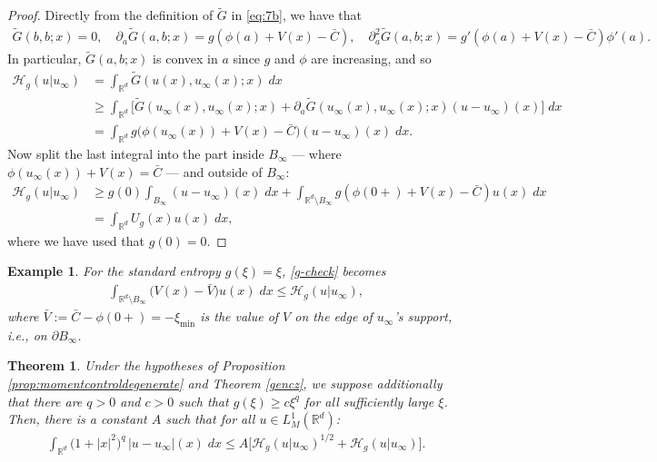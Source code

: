 \documentclass[reqno]{amsart}
\newtheorem{theorem}[lemma]{Theorem}
\newtheorem{example}[lemma]{Example}
\newcommand{\R}{\mathbb{R}}
\newcommand{\Rd}{{\R^d}}
\newcommand{\ximin}{\xi_{\text{min}}}
\newcommand{\uinf}{u_\infty}
\begin{document}
\begin{proof}
    Directly from the definition of $\tilde G$ in \eqref{eq:7b}, we have that
    \begin{align*}
        \tilde G(b,b;x) = 0, \quad
        \partial_a\tilde G(a,b;x) = g(\phi(a)+V(x)-\bar C),\quad
        \partial_a^2\tilde G(a,b;x) = g'(\phi(a)+V(x)-\bar C)\phi'(a).
    \end{align*}
    In particular, $\tilde G(a,b;x)$ is convex in $a$ since $g$ and $\phi$ are increasing, and so
    \begin{align*}
        {\mathcal{H}}_g(u|\uinf)  
        &= \int_{\R^d} \tilde G(u(x),\uinf(x);x)\;dx \\
        &\ge \int_{\R^d} \big[\tilde G(\uinf(x),\uinf(x);x) + \partial_a \tilde G(\uinf(x),\uinf(x);x) (u-\uinf)(x)\big]\;dx \\
        & = \int_{\R^d} g\big(\phi(\uinf(x))+V(x)-\bar C\big) (u-\uinf)(x)\;dx.
    \end{align*}
    Now split the last integral into the part inside $B_\infty$ --- where $\phi(\uinf(x))+V(x)=\bar C$ --- and outside of $B_\infty$:
    \begin{align*}
        {\mathcal{H}}_g(u|\uinf)  
        &\geq g(0) \int_{B_\infty}  (u-\uinf)(x)\;dx +  \int_{\R^d\setminus B_\infty} g(\phi(0+)+V(x)-\bar C) u(x)\;dx \\
        &=  \int_{\R^d} U_g (x) u(x)\;dx,
    \end{align*}
    where we have used that $g(0)=0$.
\end{proof}
%
\begin{example}
    For the standard entropy $g(\xi)=\xi$, \eqref{g-check} becomes
    \begin{align*}
        \int_{\R^d\setminus B_\infty} \big(V(x)-\bar V\big)u(x)\;dx \le {\mathcal{H}}_g(u|\uinf),
    \end{align*}
    where $\bar V:=\bar C-\phi(0+)=-\ximin$ is the value of $V$ on the edge of $\uinf$'s support, i.e., on $\partial B_\infty$.
\end{example}
%
\begin{theorem}\label{th:x-weigths}
    Under the hypotheses of  Proposition \ref{prop:momentcontroldegenerate} and Theorem \ref{gencz}, we suppose additionally that there are $q>0$ and $c>0$ such that $g(\xi)\ge c\xi^q$ for all sufficiently large $\xi$. Then, there is a constant $A$ such that for all $u\in L^1_M(\Rd)$:
    \begin{align*}
        \int_{\R^d} \big(1+|x|^2)^q \,|u-\uinf|(x)\;dx \le A\big[\mathcal{H}_g(u|\uinf)^{1/2}+\mathcal{H}_g(u|\uinf)\big].
    \end{align*}
\end{theorem}
\end{document}
